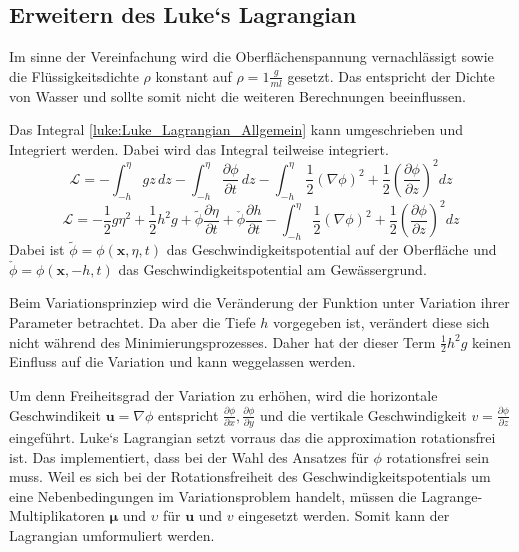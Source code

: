\subsection{Erweitern des Luke`s Lagrangian
	\label{luke:subsection:Erweitern}}
Im sinne der Vereinfachung wird die Oberflächenspannung vernachlässigt sowie die Flüssigkeitsdichte $\rho$ konstant auf $\rho = 1\frac{g}{ml}$ gesetzt. Das entspricht der Dichte von Wasser und sollte somit nicht die weiteren Berechnungen beeinflussen.

Das Integral \eqref{luke:Luke_Lagrangian_Allgemein} kann umgeschrieben und Integriert werden. Dabei wird das Integral teilweise integriert.
 \begin{equation}
 	\mathscr{L}
 	=
 	-\int_{-h}^{\eta} g z\, dz - \int_{-h}^{\eta} \frac{\partial\phi}{\partial t}\, dz -\int_{-h}^{\eta} \frac{1}{2}(\nabla\phi)^2 + \frac{1}{2}(\frac{\partial\phi}{\partial z})^2 dz
 \end{equation}
 \begin{equation}
 	\mathscr{L}
 	=
 	-\frac{1}{2}g\eta^2 + \frac{1}{2}h^2g +\tilde{\phi} \frac{\partial\eta}{\partial t} + \check{\phi} \frac{\partial h}{\partial t} -\int_{-h}^{\eta} \frac{1}{2}(\nabla\phi)^2 + \frac{1}{2}(\frac{\partial\phi}{\partial z})^2 dz
 	\label{luke:Luke_Lagrangian_allgemein_vereinfacht}
 \end{equation}
Dabei ist $\tilde{\phi} = \phi(\bm{x},\eta,t)$ das Geschwindigkeitspotential auf der Oberfläche und $\check{\phi} = \phi(\bm{x},-h,t)$ das Geschwindigkeitspotential am Gewässergrund.

Beim Variationsprinziep wird die Veränderung der Funktion unter Variation ihrer Parameter betrachtet.
Da aber die Tiefe $h$ vorgegeben ist, verändert diese sich nicht während des Minimierungsprozesses.
Daher hat der dieser Term $\frac{1}{2}h^2g$ keinen Einfluss auf die Variation und kann weggelassen werden.

Um denn Freiheitsgrad der Variation zu erhöhen, wird die horizontale Geschwindikeit $\bm{u} = \nabla\phi $ entspricht $\frac{\partial \phi}{\partial x}, \frac{\partial \phi}{\partial y}$ und die vertikale Geschwindigkeit $v = \frac{\partial \phi}{\partial z}$ eingeführt. 
Luke`s Lagrangian setzt vorraus das die approximation rotationsfrei ist.
Das implementiert, dass bei der Wahl des Ansatzes für $\phi$ rotationsfrei sein muss.
Weil es sich bei der Rotationsfreiheit des Geschwindigkeitspotentials um eine Nebenbedingungen im Variationsproblem handelt, müssen die Lagrange-Multiplikatoren $\bm{\mu}$ und $\upsilon$ für $\bm{u}$ und $v$ eingesetzt werden.
Somit kann der Lagrangian umformuliert werden.

